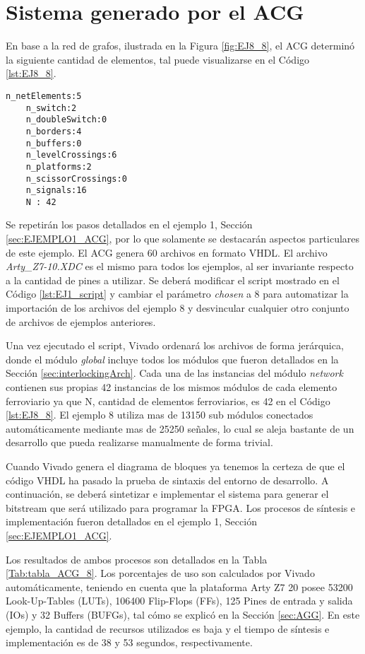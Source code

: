 \section{Sistema generado por el ACG}

	En base a la red de grafos, ilustrada en la Figura \ref{fig:EJ8_8}, el ACG determinó la siguiente cantidad de elementos, tal puede visualizarse en el Código \ref{lst:EJ8_8}.
	
	\begin{lstlisting}[language = {}, caption = Cantidad de elementos a implementar por el ACG, label = {lst:EJ8_8}]
	n_netElements:5
	n_switch:2
	n_doubleSwitch:0
	n_borders:4
	n_buffers:0
	n_levelCrossings:6
	n_platforms:2
	n_scissorCrossings:0
	n_signals:16
	N : 42
	\end{lstlisting}
	
	Se repetirán los pasos detallados en el ejemplo 1, Sección \ref{sec:EJEMPLO1_ACG}, por lo que solamente se destacarán aspectos particulares de este ejemplo. El ACG genera 60 archivos en formato VHDL. El archivo \textit{Arty\_Z7-10.XDC} es el mismo para todos los ejemplos, al ser invariante respecto a la cantidad de pines a utilizar. Se deberá modificar el script mostrado en el Código \ref{lst:EJ1_script} y cambiar el parámetro \textit{chosen} a 8 para automatizar la importación de los archivos del ejemplo 8 y desvincular cualquier otro conjunto de archivos de ejemplos anteriores.
	
	Una vez ejecutado el script, Vivado ordenará los archivos de forma jerárquica, donde el módulo \textit{global} incluye todos los módulos que fueron detallados en la Sección \ref{sec:interlockingArch}. Cada una de las instancias del módulo \textit{network} contienen sus propias 42 instancias de los mismos módulos de cada elemento ferroviario ya que N, cantidad de elementos ferroviarios, es 42 en el Código \ref{lst:EJ8_8}. El ejemplo 8 utiliza mas de 13150 sub módulos conectados automáticamente mediante mas de 25250 señales, lo cual se aleja bastante de un desarrollo que pueda realizarse manualmente de forma trivial.
	
	Cuando Vivado genera el diagrama de bloques ya tenemos la certeza de que el código VHDL ha pasado la prueba de sintaxis del entorno de desarrollo. A continuación, se deberá sintetizar e implementar el sistema para generar el bitstream que será utilizado para programar la FPGA. Los procesos de síntesis e implementación fueron detallados en el ejemplo 1, Sección \ref{sec:EJEMPLO1_ACG}.
	
	Los resultados de ambos procesos son detallados en la Tabla \ref{Tab:tabla_ACG_8}. Los porcentajes de uso son calculados por Vivado automáticamente, teniendo en cuenta que la plataforma Arty Z7 20 posee 53200 Look-Up-Tables (LUTs), 106400 Flip-Flops (FFs), 125 Pines de entrada y salida (IOs) y 32 Buffers (BUFGs), tal cómo se explicó en la Sección \ref{sec:AGG}. En este ejemplo, la cantidad de recursos utilizados es baja y el tiempo de síntesis e implementación es de 38 y 53 segundos, respectivamente.
	
